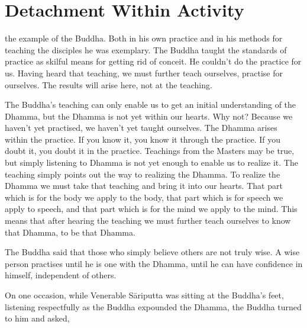 

\chapter{Detachment Within Activity}

 the example of the Buddha. Both in his own practice and in his methods for teaching the disciples he was exemplary. The Buddha taught the standards of practice as skilful means for getting rid of conceit. He couldn't do the practice for us. Having heard that teaching, we must further teach ourselves, practise for ourselves. The results will arise here, not at the teaching.

The Buddha's teaching can only enable us to get an initial understanding of the Dhamma, but the Dhamma is not yet within our hearts. Why not? Because we haven't yet practised, we haven't yet taught ourselves. The Dhamma arises within the practice. If you know it, you know it through the practice. If you doubt it, you doubt it in the practice. Teachings from the Masters may be true, but simply listening to Dhamma is not yet enough to enable us to realize it. The teaching simply points out the way to realizing the Dhamma. To realize the Dhamma we must take that teaching and bring it into our hearts. That part which is for the body we apply to the body, that part which is for speech we apply to  speech, and that part which is for the mind we apply to the mind. This means that after hearing the teaching we must further teach ourselves to know that Dhamma, to be that Dhamma.

The Buddha said that those who simply believe others are not truly wise. A wise person practises until he is one with the Dhamma, until he can have confidence in himself, independent of others.

On one occasion, while Venerable S\=ariputta was sitting at the Buddha's feet, listening respectfully as the Buddha expounded the Dhamma, the Buddha turned to him and asked,

